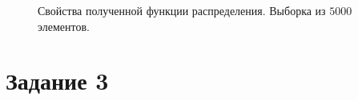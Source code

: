 \documentclass[12pt, a4paper]{article}
\begin{document}
\begin{figure}[H]
\caption{Свойства полученной функции распределения. Выборка из $5000$ элементов.}
\end{figure}

\newpage

\section{Задание 3}
\end{document}
